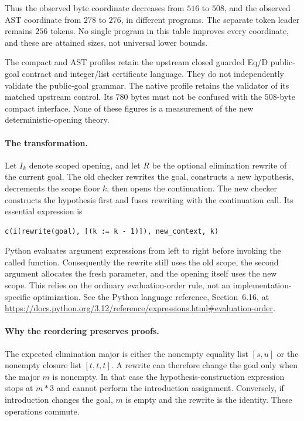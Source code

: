 \documentclass[11pt,letterpaper]{article}
\theoremstyle{definition}
\begin{document}
Thus the observed byte coordinate decreases from $516$ to $508$, and the
observed AST coordinate from $278$ to $276$, in different programs. The
separate token leader remains $256$ tokens. No single program in this table
improves every coordinate, and these are attained sizes, not universal
lower bounds.

The compact and AST profiles retain the upstream closed guarded Eq/D
public-goal contract and integer/list certificate language. They do not
independently validate the public-goal grammar. The native profile retains
the validator of its matched upstream control. Its $780$ bytes must not be
confused with the $508$-byte compact interface. None of these figures is a
measurement of the new deterministic-opening theory.

\paragraph{The transformation.}
Let $I_k$ denote scoped opening, and let $R$ be the optional elimination
rewrite of the current goal. The old checker rewrites the goal, constructs
a new hypothesis, decrements the scope floor $k$, then opens the
continuation. The new checker constructs the hypothesis first and fuses
rewriting with the continuation call. Its essential expression is
\begin{verbatim}
c(i(rewrite(goal), [(k := k - 1)]), new_context, k)
\end{verbatim}
Python evaluates argument expressions from left to right before invoking
the called function. Consequently the rewrite still uses the old scope,
the second argument allocates the fresh parameter, and the opening itself
uses the new scope. This relies on the ordinary evaluation-order rule, not
an implementation-specific optimization. See the Python language reference,
Section~6.16, at
\url{https://docs.python.org/3.12/reference/expressions.html#evaluation-order}.

\paragraph{Why the reordering preserves proofs.}
The expected elimination major is either the nonempty equality list
$[s,u]$ or the nonempty closure list $[t,t,t]$. A rewrite can therefore
change the goal only when the major $m$ is nonempty. In that case the
hypothesis-construction expression stops at $m*3$ and cannot perform the
introduction assignment. Conversely, if introduction changes the goal,
$m$ is empty and the rewrite is the identity. These operations commute.
\end{document}
